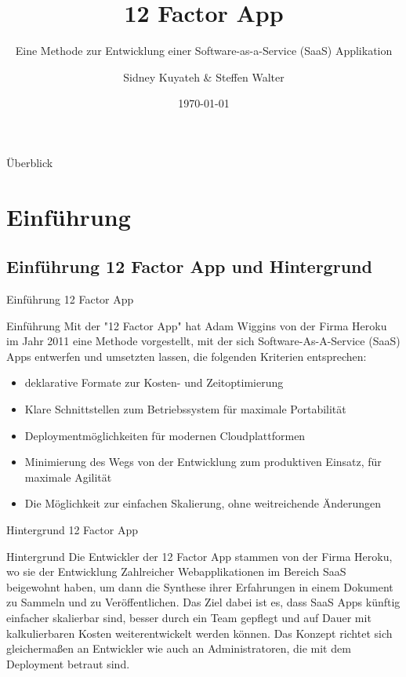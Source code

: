 \documentclass{beamer}
\title{12 Factor App}
\subtitle{Eine Methode zur Entwicklung einer Software-as-a-Service (SaaS) Applikation}
\author{Sidney Kuyateh \& Steffen Walter}
\institute{Duale Hochschule Baden-Württemberg}
\date{\today}
\begin{document}
	\maketitle
	\begin{frame}{Überblick}
		\scriptsize
		\setlength{\baselineskip}{7pt}
		\vspace{0.3cm}
		\tableofcontents
		\vfill
	\end{frame}
		\section{Einführung}
			\subsection{Einführung 12 Factor App und Hintergrund}
				\begin{frame}{Einführung 12 Factor App}
					\begin{block}{Einführung}
						Mit der "12 Factor App" hat Adam Wiggins von der Firma Heroku im Jahr 2011 eine Methode vorgestellt, mit der sich Software-As-A-Service (SaaS) Apps entwerfen und umsetzten lassen, die folgenden Kriterien entsprechen:
						\begin{itemize}
							\item deklarative Formate zur Kosten- und Zeitoptimierung
							\item Klare Schnittstellen zum Betriebssystem für maximale Portabilität
							\item Deploymentmöglichkeiten für modernen Cloudplattformen
							\item Minimierung des Wegs von der Entwicklung zum produktiven Einsatz, für maximale Agilität
							\item Die Möglichkeit zur einfachen Skalierung, ohne weitreichende Änderungen
						\end{itemize}
					\end{block}
				\end{frame}
				\begin{frame}{Hintergrund 12 Factor App}
					\begin{block}{Hintergrund}
						Die Entwickler der 12 Factor App stammen von der Firma Heroku, wo sie der Entwicklung Zahlreicher Webapplikationen im Bereich SaaS beigewohnt haben, um dann die Synthese ihrer Erfahrungen in einem Dokument zu Sammeln und zu Veröffentlichen.\newline
						Das Ziel dabei ist es, dass SaaS Apps künftig einfacher skalierbar sind, besser durch ein Team gepflegt und auf Dauer mit kalkulierbaren Kosten weiterentwickelt werden können. Das Konzept richtet sich gleichermaßen an Entwickler wie auch an Administratoren, die mit dem Deployment betraut sind.
					\end{block}
				\end{frame}
\end{document}
